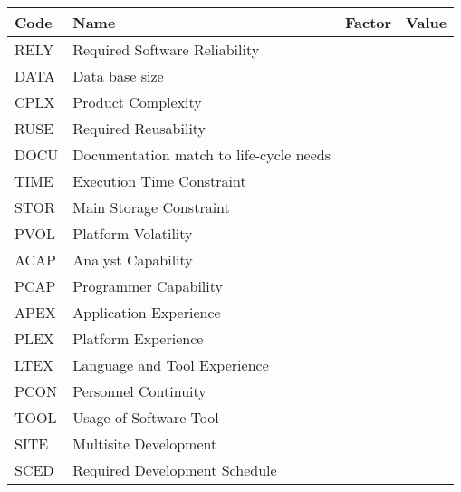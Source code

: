 	\begin{tabular}{|l|l|l|l|}
	\hline
	\textbf{Code} & \textbf{Name} & \textbf{Factor} & \textbf{Value}\\
	\hline
	RELY & Required Software Reliability & &\\
	\hline
	DATA & Data base size & &\\
	\hline
	CPLX & Product Complexity & & \\
	\hline
	RUSE& Required Reusability & & \\
	\hline
	DOCU & Documentation match to life-cycle needs & & \\
	\hline
	TIME & Execution Time Constraint & &\\
	\hline
	STOR & Main Storage Constraint & &\\
	\hline
	PVOL & Platform Volatility & & \\
	\hline
	ACAP & Analyst Capability & & \\
	\hline
	PCAP & Programmer Capability & & \\
	\hline
	APEX & Application Experience & &\\
	\hline
	PLEX & Platform Experience & &\\
	\hline
	LTEX & Language and Tool Experience & & \\
	\hline
	PCON & Personnel Continuity & & \\
	\hline
	TOOL & Usage of Software Tool & & \\
	\hline
	SITE & Multisite Development & &\\
	\hline
	SCED & Required Development Schedule & &\\
	\hline
	
	\end{tabular}
	